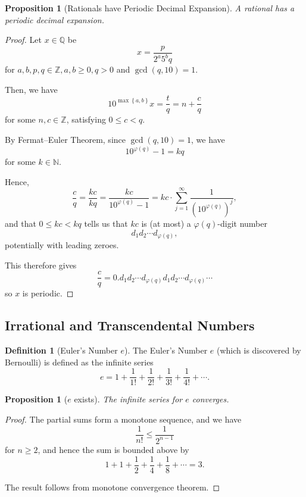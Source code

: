 \documentclass{article}
\newtheorem{proposition}[theorem]{Proposition}
\theoremstyle{definition}
\newtheorem{definition}[theorem]{Definition}
\theoremstyle{remark}
\newcommand{\pqty}[1]{\left(#1\right)}
\newcommand{\Bqty}[1]{\left\{#1\right\}}
\newcommand{\totient}{\varphi}
\newcommand{\NN}{\mathbb{N}}
\newcommand{\ZZ}{\mathbb{Z}}
\newcommand{\QQ}{\mathbb{Q}}
\begin{document}
\begin{proposition}[Rationals have Periodic Decimal Expansion]
    A rational has a periodic decimal expansion.
\end{proposition}

\begin{proof}
    Let \(x \in \QQ\) be
    \[
        x = \frac{p}{2^a 5^b q}
    \]
    for \(a, b, p, q \in \ZZ, a, b \geq 0, q > 0\) and \(\gcd\pqty{q, 10} = 1\).

    Then, we have
    \[
        10^{\max\Bqty{a, b}} x = \frac{t}{q} = n + \frac{c}{q}
    \]
    for some \(n, c \in \ZZ\), satisfying \(0 \leq c < q\).

    By Fermat--Euler Theorem, since \(\gcd\pqty{q, 10} = 1\), we have
    \[
        10^{\totient\pqty{q}} - 1 = kq
    \]
    for some \(k \in \NN\).

    Hence,
    \[
        \frac{c}{q} = \frac{kc}{kq} = \frac{kc}{10^{\totient\pqty{q}} - 1} = kc \cdot \sum_{j = 1}^{\infty} \frac{1}{\pqty{10^{\totient\pqty{q}}}^j},
    \]
    and that \(0 \leq kc < kq\) tells us that \(kc\) is (at most) a \(\totient\pqty{q}\)-digit number
    \[
        d_1 d_2 \cdots d_{\totient\pqty{q}},
    \]
    potentially with leading zeroes.

    This therefore gives
    \[
        \frac{c}{q} = 0.d_1 d_2 \cdots d_{\totient\pqty{q}} d_1 d_2 \cdots d_{\totient\pqty{q}} \cdots
    \]
    so \(x\) is periodic.
\end{proof}

\subsection{Irrational and Transcendental Numbers}

\begin{definition}[Euler's Number \(e\)]
    The Euler's Number \(e\) (which is discovered by Bernoulli) is defined as the infinite series
    \[
        e = 1 + \frac{1}{1!} + \frac{1}{2!} + \frac{1}{3!} + \frac{1}{4!} + \cdots.
    \]
\end{definition}

\begin{proposition}[\(e\) exists]
    The infinite series for \(e\) converges.
\end{proposition}

\begin{proof}
    The partial sums form a monotone sequence, and we have
    \[
        \frac{1}{n!} \leq \frac{1}{2^{n - 1}}
    \]
    for \(n \geq 2\), and hence the sum is bounded above by
    \[
        1 + 1 + \frac{1}{2} + \frac{1}{4} + \frac{1}{8} + \cdots = 3.
    \]

    The result follows from monotone convergence theorem.
\end{proof}
\end{document}
